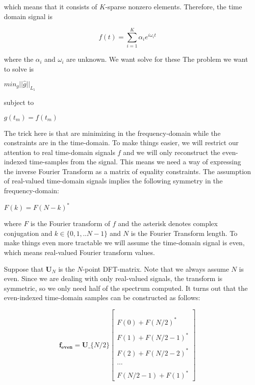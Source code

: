 \documentclass[letterpaper,10pt,english]{/usr/lib/python2.7/site-packages/sphinx/texinputs/sphinxhowto}
\begin{document}
which means that it consists of $K$-sparse nonzero elements. Therefore,
the time domain signal is

\[ f(t) =  \sum_{i=1}^K \alpha_i e^{i \omega_i t} \]

where the $\alpha_i$ and $\omega_i$ are unknown. We want solve for these
The problem we want to solve is

$min_g || \hat{g} ||_{L_1}$

subject to

$g(t_m)=f(t_m)$

The trick here is that are minimizing in the frequency-domain while the
constraints are in the time-domain. To make things easier, we will
restrict our attention to real time-domain signals $f$ and we will only
reconstruct the even-indexed time-samples from the signal. This means we
need a way of expressing the inverse Fourier Transform as a matrix of
equality constraints. The assumption of real-valued time-domain signals
implies the following symmetry in the frequency-domain:

$F(k) = F(N-k)^*$

where $F$ is the Fourier transform of $f$ and the asterisk denotes
complex conjugation and $k\in \lbrace 0,1,..N-1\rbrace$ and $N$ is the
Fourier Transform length. To make things even more tractable we will
assume the time-domain signal is even, which means real-valued Fourier
transform values.

Suppose that $\mathbf{U}_N$ is the $N$-point DFT-matrix. Note that we
always assume $N$ is even. Since we are dealing with only real-valued
signals, the transform is symmetric, so we only need half of the
spectrum computed. It turns out that the even-indexed time-domain
samples can be constructed as follows:

\[\mathbf{f_{even}} = \mathbf{U}\_\{N/2\}
\begin{bmatrix}\\\\
F(0)+F(N/2)^* \\\\
F(1)+F(N/2-1)^* \\\\
F(2)+F(N/2-2)^* \\\\
\dots \\\\
F(N/2-1)+F(1)^* 
\end{bmatrix}\]
\end{document}
